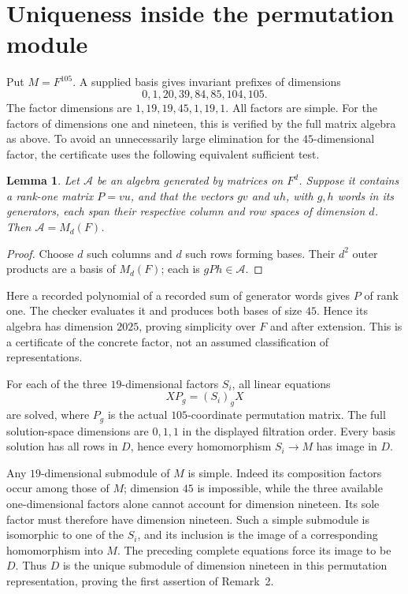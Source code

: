 \documentclass[11pt,a4paper]{article}
\newtheorem{lemma}{Lemma}
\begin{document}
\section{Uniqueness inside the permutation module}
Put $M=F^{105}$. A supplied basis gives invariant prefixes of dimensions
\[
 0,1,20,39,84,85,104,105.
\]
The factor dimensions are $1,19,19,45,1,19,1$.
All factors are simple. For the factors of dimensions one and nineteen,
this is verified by the full matrix algebra as above. To avoid an
unnecessarily large elimination for the $45$-dimensional factor, the
certificate uses the following equivalent sufficient test.

\begin{lemma}\label{lem:rankone}
Let $\mathcal A$ be an algebra generated by matrices on $F^d$.
Suppose it contains a rank-one matrix $P=vu$, and that the vectors $gv$
and $uh$, with $g,h$ words in its generators, each span their respective
column and row spaces of dimension $d$. Then $\mathcal A=M_d(F)$.
\end{lemma}
\begin{proof}
Choose $d$ such columns and $d$ such rows forming bases. Their $d^2$
outer products are a basis of $M_d(F)$; each is $gPh\in\mathcal A$.
\end{proof}

Here a recorded polynomial of a recorded sum of generator words gives
$P$ of rank one. The checker evaluates it and produces both bases of
size $45$. Hence its algebra has dimension $2025$, proving simplicity
over $F$ and after extension. This is a certificate of the concrete
factor, not an assumed classification of representations.

For each of the three $19$-dimensional factors $S_i$, all linear equations
\[
 XP_g=(S_i)_gX
\]
are solved, where $P_g$ is the actual $105$-coordinate permutation
matrix. The full solution-space dimensions are $0,1,1$ in the displayed
filtration order. Every basis solution has all rows in $D$, hence every
homomorphism $S_i\to M$ has image in $D$.

Any $19$-dimensional submodule of $M$ is simple. Indeed its composition
factors occur among those of $M$; dimension $45$ is impossible, while
the three available one-dimensional factors alone cannot account for
dimension nineteen. Its sole factor must therefore have dimension
nineteen. Such a simple submodule is isomorphic to one of the $S_i$,
and its inclusion is the image of a corresponding homomorphism into
$M$. The preceding complete equations force its image to be $D$.
Thus $D$ is the unique submodule of dimension nineteen in this
permutation representation, proving the first assertion of Remark~2.
\end{document}

